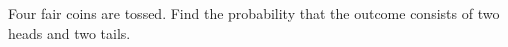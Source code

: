 Four fair coins are tossed. Find the probability that the outcome consists of two heads and two tails.
